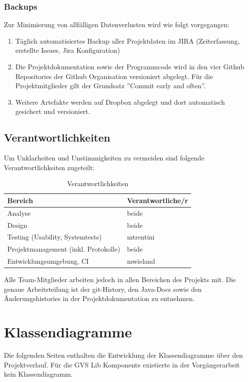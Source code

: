 \documentclass[11pt,a4paper,english,oneside]{book}
\numberwithin{equation}{chapter}
\begin{document}
	\subsection{Backups}
	\label{sec:backup}
	Zur Minimierung von allfälligen Datenverlusten wird wie folgt vorgegangen:
	
	\begin{enumerate}
		\item Täglich automatisiertes Backup aller Projektdaten im JIRA \cite{jira} (Zeiterfassung, erstellte Issues, Jira Konfiguration)
		\item Die Projektdokumentation sowie der Programmcode wird in den vier Github Repositories der Github Organisation \cite{github} versioniert abgelegt. Für die Projektmitglieder gilt der Grundsatz ''Commit early and often''.
		\item Weitere Artefakte werden auf Dropbox \cite{dropbox} abgelegt und dort automatisch gesichert und versioniert.
	\end{enumerate}
	
	\section{Verantwortlichkeiten}
	Um Unklarheiten und Unstimmigkeiten zu vermeiden sind folgende Verantwortlichkeiten zugeteilt:
	
	\begin{table}[h!]
		\centering
		\begin{tabular}{l l}
			\toprule 
			Bereich & Verantwortliche/r \\
			\toprule 
			Analyse & beide \\
			Design & beide \\ 
			Testing (Usability, Systemtests) & mtrentini \\
			Projektmanagement (inkl. Protokolle) & beide \\
			Entwicklungsumgebung, CI & mwieland \\
			\bottomrule 
		\end{tabular} 
		\caption{Verantwortlichkeiten} 
	\end{table}
	
	Alle Team-Mitglieder arbeiten jedoch in allen Bereichen des Projekts mit. 
	Die genaue Arbeitsteilung ist der git-History, den Java-Docs sowie den Änderungshistories in der Projektdokumentation zu entnehmen.
	
	\chapter{Klassendiagramme} \label{ch:class-diagram}
	Die folgenden Seiten enthalten die Entwicklung der Klassendiagramme über den Projektverlauf. Für die GVS Lib Komponente existierte in der Vorgängerarbeit kein Klassendiagramm.
	
\end{document}
